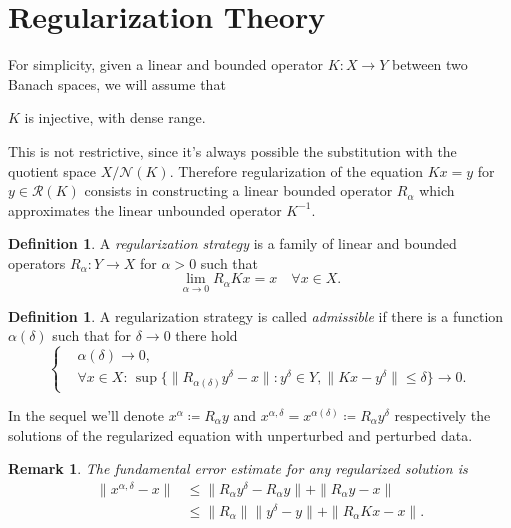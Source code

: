 \documentclass[10pt, a4paper, twoside, openright]{book}
\theoremstyle{definition}
\newtheorem{definition}[subsection]{Definition}
\theoremstyle{plain}
\theoremstyle{plain}
\theoremstyle{plain}
\theoremstyle{plain}
\newtheorem{remark}[subsection]{Remark}
\theoremstyle{plain}
\theoremstyle{plain}
\theoremstyle{plain}
\theoremstyle{plain}
\begin{document}
\section{Regularization Theory}
For simplicity, given a linear and bounded operator $K:X\to Y$ between two Banach spaces, we will assume that
\begin{center}
 $K$ is injective, with dense range.
\end{center}
This is not restrictive, since it's always possible the substitution with the quotient space $X/ \mathcal{N}(K)$.
Therefore regularization of the equation $Kx=y$ for $y\in\mathcal{R}(K)$ consists in constructing a linear bounded operator $R_\alpha$ which approximates the linear unbounded operator $K^{-1}$.
\begin{definition}
 A \emph{regularization strategy} is a family of linear and bounded operators $R_\alpha : Y \to X$  for $\alpha> 0$ such that
 \begin{equation}
  \lim_{\alpha\to 0}R_\alpha Kx = x\quad \forall x \in X.
 \end{equation}
\end{definition}
\begin{definition}
\label{def:admissibility-reg-strategy}
 A regularization strategy is called \emph{admissible} if there is a function $\alpha(\delta)$ such that for $\delta \to 0$ there hold
 \begin{equation}
 \left\{
 \begin{aligned}
  &\alpha(\delta) \to 0, \\
  &\forall x \in X: \,\sup\bigl\{\bigl\|R_{\alpha(\delta)} y^\delta - x\bigr\|:y^\delta \in Y, \|Kx - y^\delta\|\leq\delta\bigr\} \to 0.
 \end{aligned}
 \right.
 \end{equation}
\end{definition}
In the sequel we'll denote $x^{\alpha}\coloneqq R_\alpha y$ and 
$x^{\alpha,\delta}=x^{\alpha(\delta)}\coloneqq R_\alpha y^\delta$ respectively the solutions of the regularized equation with unperturbed and perturbed data.  
\begin{remark}
The fundamental error estimate for any regularized solution is
\begin{align}
\label{eq:fundamental-error-estimate}
 \|x^{\alpha, \delta} - x\| &\leq \|R_\alpha y^\delta - R_\alpha y\| + \|R_\alpha y - x\| \\
                            &\leq \|R_\alpha\| \|y^\delta - y\| + \|R_\alpha Kx - x\|.
\end{align}
\end{remark}
\end{document}
